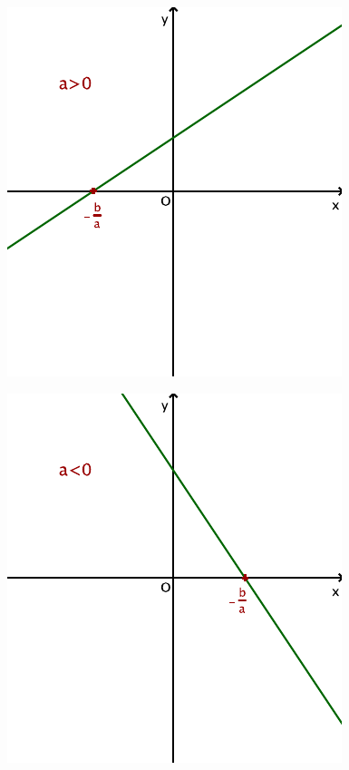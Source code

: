 \begin{minipage}[c]{0.4\linewidth}
  \centering
  \includegraphics[width=0.6\linewidth]{F_Affine_a.pdf}
\end{minipage}
\quad
\begin{minipage}[c]{0.4\linewidth}
  \centering
  \includegraphics[width=0.6\linewidth]{F_Affine_b.pdf}
\end{minipage}



